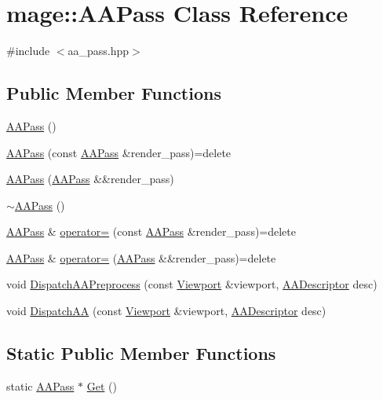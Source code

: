 \hypertarget{classmage_1_1_a_a_pass}{}\section{mage\+:\+:A\+A\+Pass Class Reference}
\label{classmage_1_1_a_a_pass}


{\ttfamily \#include $<$aa\+\_\+pass.\+hpp$>$}

\subsection*{Public Member Functions}
\begin{DoxyCompactItemize}
\item 
\hyperlink{classmage_1_1_a_a_pass_a252ae39e2a24d3c82294aa9f308877b1}{A\+A\+Pass} ()
\item 
\hyperlink{classmage_1_1_a_a_pass_ad51f0e6fb81fe0f61f9e1eddb5571f98}{A\+A\+Pass} (const \hyperlink{classmage_1_1_a_a_pass}{A\+A\+Pass} \&render\+\_\+pass)=delete
\item 
\hyperlink{classmage_1_1_a_a_pass_a86da6ec985d907544991c9cd646982bd}{A\+A\+Pass} (\hyperlink{classmage_1_1_a_a_pass}{A\+A\+Pass} \&\&render\+\_\+pass)
\item 
\hyperlink{classmage_1_1_a_a_pass_af7660ffa2372608eb597918026ef1e19}{$\sim$\+A\+A\+Pass} ()
\item 
\hyperlink{classmage_1_1_a_a_pass}{A\+A\+Pass} \& \hyperlink{classmage_1_1_a_a_pass_a6ca1b1c932026a4270b5e738c2d63b40}{operator=} (const \hyperlink{classmage_1_1_a_a_pass}{A\+A\+Pass} \&render\+\_\+pass)=delete
\item 
\hyperlink{classmage_1_1_a_a_pass}{A\+A\+Pass} \& \hyperlink{classmage_1_1_a_a_pass_a30ea0c8c3eb57cb4995cb3232bde6514}{operator=} (\hyperlink{classmage_1_1_a_a_pass}{A\+A\+Pass} \&\&render\+\_\+pass)=delete
\item 
void \hyperlink{classmage_1_1_a_a_pass_a02d5dc1bf51385e13d81c6304be2c9ae}{Dispatch\+A\+A\+Preprocess} (const \hyperlink{classmage_1_1_viewport}{Viewport} \&viewport, \hyperlink{namespacemage_a86cd40b8f2f42ca4d616cc6ec665a7f2}{A\+A\+Descriptor} desc)
\item 
void \hyperlink{classmage_1_1_a_a_pass_a43acad147f780a11881b72c4d9a6c0f6}{Dispatch\+AA} (const \hyperlink{classmage_1_1_viewport}{Viewport} \&viewport, \hyperlink{namespacemage_a86cd40b8f2f42ca4d616cc6ec665a7f2}{A\+A\+Descriptor} desc)
\end{DoxyCompactItemize}
\subsection*{Static Public Member Functions}
\begin{DoxyCompactItemize}
\item 
static \hyperlink{classmage_1_1_a_a_pass}{A\+A\+Pass} $\ast$ \hyperlink{classmage_1_1_a_a_pass_a45b63b6ea60b3709556da1e00f0ab672}{Get} ()
\end{DoxyCompactItemize}
